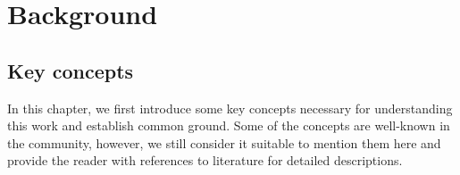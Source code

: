 \chapter{Background}%
\label{chap:background}
\section{Key concepts}
\label{backgound:basics}
In this chapter, we first introduce some key concepts necessary for understanding this work and establish common ground.
Some of the concepts are well-known in the community, however, we still consider it suitable to mention them here and provide the reader with references to literature for detailed descriptions.

